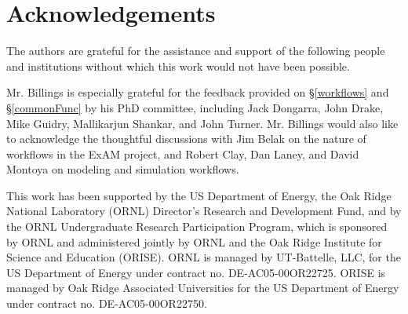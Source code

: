 \section{Acknowledgements} The authors are grateful for the assistance and
support of the following people and institutions without which this work would
not have been possible.

Mr. Billings is especially grateful for the feedback provided on
\S\ref{workflows} and \S\ref{commonFunc} by his PhD committee, including Jack Dongarra, John Drake, Mike Guidry, Mallikarjun Shankar, and John Turner. Mr.
Billings would also like to acknowledge the thoughtful discussions with Jim
Belak on the nature of workflows in the ExAM project, and Robert Clay, Dan
Laney, and David Montoya on modeling and simulation workflows.

This work has been supported by the US Department of Energy, the Oak Ridge National Laboratory (ORNL) Director's Research and Development Fund, and by the ORNL
Undergraduate Research Participation Program, which is sponsored by ORNL and
administered jointly by ORNL and the Oak Ridge Institute for Science and
Education (ORISE). ORNL is managed by UT-Battelle, LLC, for the US Department
of Energy under contract no. DE-AC05-00OR22725. ORISE is managed by Oak Ridge
Associated Universities for the US Department of Energy under contract no.
DE-AC05-00OR22750.
